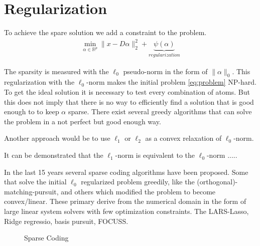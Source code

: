 \section{Regularization}
To achieve the spare solution we add a constraint to the problem. 
\begin{align}
\min_{\alpha\in\mathbb{R}^{p}} \lVert x - D\alpha \rVert^{2}_{2} + \underbrace{\psi(\alpha)}_{regularization}
\end{align}

The sparsity is measured with the $\ell_0$ pseudo-norm in the form
of $\lVert\alpha\rVert_{0}$. This regularization with the $\ell_0$-norm makes
the initial problem \ref{eq:problem} NP-hard. To get the ideal solution it is
necessary to test every combination of atoms. But this does not imply that there
is no way to efficiently find a solution that is good enough to to keep $\alpha$
sparse. There exist several greedy algorithms that can solve the problem in a
not perfect but good enough way. 

Another approach would be to use $\ell_1$ or $\ell_2$ as a convex relaxation of
$\ell_0$-norm.

It can be demonstrated that the $\ell_1$-norm is equivalent to the $\ell_0$-norm .....

In the last 15 years several sparse coding algorithms have been proposed. Some
that solve the initial $\ell_0$ regularized problem greedily, like
the (orthogonal)-matching-pursuit, and others which modified the problem to
become convex/linear. These primary derive from the numerical domain in the form
of large linear system solvers with few optimization constraints. The
LARS-Lasso, Ridge regressio, basis pursuit, FOCUSS.



\begin{figure}
\centering
\caption{Sparse Coding}
\label{fig:da_x}
\end{figure}






